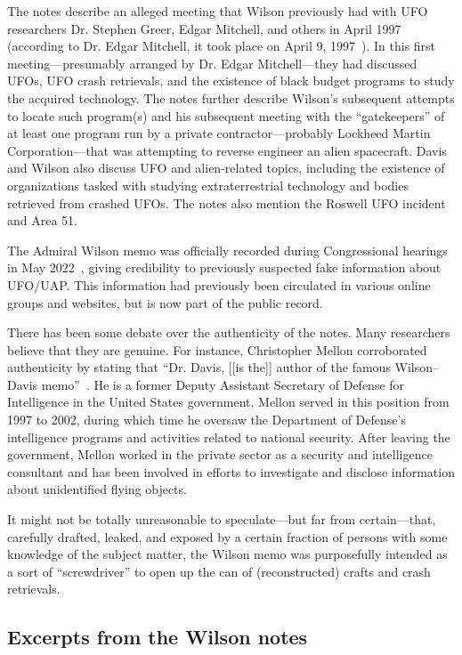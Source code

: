 The notes describe an alleged meeting that Wilson previously had with UFO researchers Dr. Stephen Greer, Edgar Mitchell, and others in April 1997 (according to Dr. Edgar Mitchell, it took place on April 9, 1997~\cite[p.~1]{WilsonNotes-Davis}). In this first meeting---presumably arranged by Dr. Edgar Mitchell---they had discussed UFOs, UFO crash retrievals, and the existence of black budget programs to study the acquired technology. The notes further describe Wilson's subsequent attempts to locate such program(s) and his subsequent meeting with the ``gatekeepers'' of at least one program run by a private contractor---probably Lockheed Martin Corporation---that was attempting to reverse engineer an alien spacecraft. Davis and Wilson also discuss UFO and alien-related topics, including the existence of organizations tasked with studying extraterrestrial technology and bodies retrieved from crashed UFOs. The notes also mention the Roswell UFO incident and Area 51.

The Admiral Wilson memo was officially recorded during Congressional hearings in May 2022~\cite{WilsonNotes-Davis}, giving credibility to previously suspected fake information about UFO/UAP. This information had previously been circulated in various online groups and websites, but is now part of the public record.

There has been some debate over the authenticity of the notes. Many researchers believe that they are genuine. For instance, Christopher Mellon corroborated authenticity by stating that ``Dr. Davis, [[is the]] author of the famous Wilson--Davis memo''~\cite{Mellon2022Dec}. He is a former Deputy Assistant Secretary of Defense for Intelligence in the United States government. Mellon served in this position from 1997 to 2002, during which time he oversaw the Department of Defense's intelligence programs and activities related to national security. After leaving the government, Mellon worked in the private sector as a security and intelligence consultant and has been involved in efforts to investigate and disclose information about unidentified flying objects.

It might not be totally unreasonable to speculate---but far from certain---that, carefully drafted, leaked, and exposed by a certain fraction of persons with some knowledge of the subject matter, the Wilson memo was purposefully intended as a sort of ``screwdriver'' to open up the can of (reconstructed) crafts and crash retrievals.

\subsection{Excerpts from the Wilson notes}

